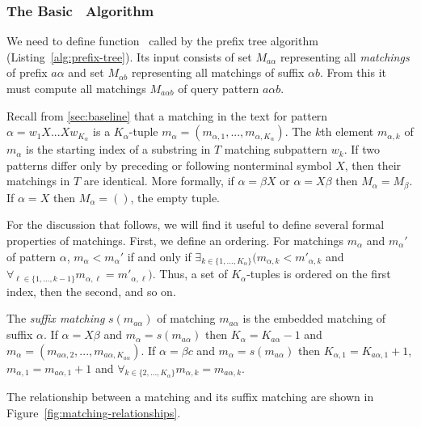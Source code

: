 \theoremstyle{definition}
\newtheorem{definition}{Definition}

\subsubsection{The Basic \queryfunc\ Algorithm}
\label{sec:collocation-algorithm}

We need to define function \queryfunc\ called
by the prefix tree algorithm (Listing~\ref{alg:prefix-tree}).
Its input consists of set $M_{a\alpha}$ representing all
{\em matchings} of prefix $a\alpha$ and set $M_{\alpha{}b}$ representing all
matchings of suffix $\alpha{}b$.  From this it must compute 
all matchings $M_{a\alpha{}b}$ of query pattern $a\alpha{}b$.

Recall from \textsection\ref{sec:baseline} that
a matching in the text for pattern 
$\alpha = w_1 X ... X w_{K_\alpha}$ is a $K_\alpha$-tuple 
$m_\alpha = (m_{\alpha,1}, ..., m_{\alpha,K_\alpha})$. 
The $k$th element $m_{\alpha,k}$ of $m_\alpha$ is the starting index
of a substring in $T$ matching subpattern $w_k$.  If two patterns
differ only by preceding or following nonterminal symbol $X$, then
their matchings in $T$ are identical.  More formally, 
if $\alpha = \beta{}X$ or $\alpha = X\beta$ then 
$M_\alpha = M_\beta$.  If $\alpha = X$
then $M_\alpha = ()$, the empty tuple.

For the discussion that follows, we will find it useful to 
define several formal properties of matchings.  First, we define an ordering.
For matchings $m_\alpha$ and $m_\alpha'$ of pattern $\alpha$,
$m_\alpha < m_\alpha'$ if and only if $\exists_{k \in \{1,...,K_\alpha\}} (m_{\alpha,k} < m'_{\alpha,k}$ and $\forall_{\ell \in \{1,...,k-1\}}  m_{\alpha,\ell} = m'_{\alpha,\ell})$.
Thus, a set of $K_\alpha$-tuples is ordered on the first index, 
then the second, and so on.

The {\em suffix matching} $s(m_{a\alpha})$ of 
matching $m_{a\alpha}$ is 
the embedded matching of suffix $\alpha$.
If $\alpha = X\beta$ and $m_{\alpha} = s(m_{a\alpha{}})$
then $K_{\alpha} = K_{a\alpha}-1$ and
$m_\alpha = (m_{a\alpha,2},...,m_{a\alpha,K_{a\alpha}})$.
If $\alpha = \beta{}c$ and $m_{\alpha} = s(m_{a\alpha{}})$
then $K_{\alpha,1} = K_{a\alpha,1}+1$, $m_{\alpha,1} = m_{a\alpha,1}+1$ and 
$\forall_{k \in \{2,...,K_{\alpha}\}} m_{\alpha,k} = m_{a\alpha,k}$.

The relationship between a matching and its suffix matching are shown in Figure~\ref{fig:matching-relationships}.

